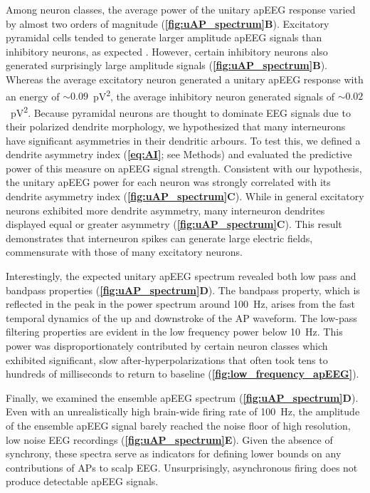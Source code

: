 Among neuron classes, the average power of the unitary apEEG response varied by almost two orders of magnitude (\textbf{\autoref{fig:uAP_spectrum}B}). Excitatory pyramidal cells tended to generate larger amplitude apEEG signals than inhibitory neurons, as expected \cite{Thio2023}. However, certain inhibitory neurons also generated surprisingly large amplitude signals (\textbf{\autoref{fig:uAP_spectrum}B}). Whereas the average excitatory neuron generated a unitary apEEG response with an energy of ${\sim}0.09$~\unit{\pico\volt^2}, the average inhibitory neuron generated signals of ${\sim}0.02$~\unit{\pico\volt^2}. Because pyramidal neurons are thought to dominate EEG signals due to their polarized dendrite morphology, we hypothesized that many interneurons have significant asymmetries in their dendritic arbours. To test this, we defined a dendrite asymmetry index (\textbf{\ref{eq:AI}}; see Methods) and evaluated the predictive power of this measure on apEEG signal strength. Consistent with our hypothesis, the unitary apEEG power for each neuron was strongly correlated with its dendrite asymmetry index (\textbf{\autoref{fig:uAP_spectrum}C}). While in general excitatory neurons exhibited more dendrite asymmetry, many interneuron dendrites displayed equal or greater asymmetry (\textbf{\autoref{fig:uAP_spectrum}C}). This result demonstrates that interneuron spikes can generate large electric fields, commensurate with those of many excitatory neurons. 

Interestingly, the expected unitary apEEG spectrum revealed both low pass and bandpass properties (\textbf{\autoref{fig:uAP_spectrum}D}). The bandpass property, which is reflected in the peak in the power spectrum around 100~\unit{\hertz}, arises from the fast temporal dynamics of the up and downstroke of the AP waveform. The low-pass filtering properties are evident in the low frequency power below 10~\unit{\hertz}. This power was disproportionately contributed by certain neuron classes which exhibited significant, slow after-hyperpolarizations that often took tens to hundreds of milliseconds to return to baseline (\textbf{\autoref{fig:low_frequency_apEEG}}). 

Finally, we examined the ensemble apEEG spectrum (\textbf{\autoref{fig:uAP_spectrum}D}). Even with an unrealistically high brain-wide firing rate of 100~\unit{\hertz}, the amplitude of the ensemble apEEG signal barely reached the noise floor of high resolution, low noise EEG recordings (\textbf{\autoref{fig:uAP_spectrum}E}). Given the absence of synchrony, these spectra serve as indicators for defining lower bounds on any contributions of APs to scalp EEG. Unsurprisingly, asynchronous firing does not produce detectable apEEG signals.

